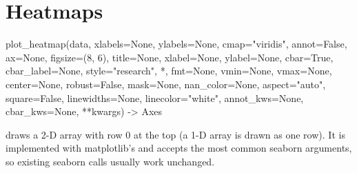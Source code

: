 \section{Heatmaps}\label{sec:plotkit-heatmaps}

\begin{pycode}
plot_heatmap(data, xlabels=None, ylabels=None, cmap="viridis", annot=False,
             ax=None, figsize=(8, 6), title=None, xlabel=None, ylabel=None,
             cbar=True, cbar_label=None, style="research", *, fmt=None,
             vmin=None, vmax=None, center=None, robust=False, mask=None,
             nan_color=None, aspect="auto", square=False, linewidths=None,
             linecolor="white", annot_kws=None, cbar_kws=None, **kwargs) -> Axes
\end{pycode}

 draws a 2-D array with row 0 at the top (a 1-D array is
drawn as one row). It is implemented with matplotlib's  and
accepts the most common seaborn arguments, so existing seaborn calls usually
work unchanged.

